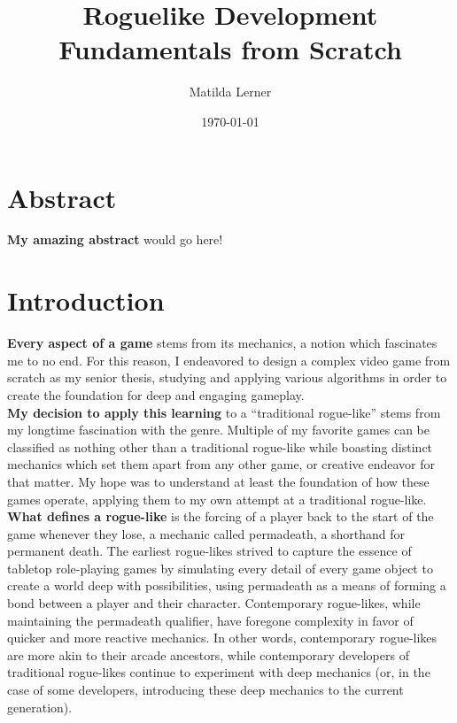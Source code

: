 \documentclass[sigconf,nonacm]{acmart}
\begin{document}
\title{Roguelike Development Fundamentals from Scratch}
\author{Matilda Lerner}
\date{\today}
\maketitle

\tableofcontents
\newpage
{}

\section{Abstract}
\textbf {My amazing abstract} would go here!

\section{Introduction}
\textbf {Every aspect of a game} stems from its mechanics, a notion which fascinates me to no end. For this reason, I endeavored to design a complex video game from scratch as my senior thesis, studying and applying various algorithms in order to create the foundation for deep and engaging gameplay.\\

\textbf {My decision to apply this learning} to a “traditional rogue-like” stems from my longtime fascination with the genre. Multiple of my favorite games can be classified as nothing other than a traditional rogue-like while boasting distinct mechanics which set them apart from any other game, or creative endeavor for that matter. My hope was to understand at least the foundation of how these games operate, applying them to my own attempt at a traditional rogue-like.\\

\textbf {What defines a rogue-like} is the forcing of a player back to the start of the game whenever they lose, a mechanic called permadeath, a shorthand for permanent death. The earliest rogue-likes strived to capture the essence of tabletop role-playing games by simulating every detail of every game object to create a world deep with possibilities, using permadeath as a means of forming a bond between a player and their character. Contemporary rogue-likes, while maintaining the permadeath qualifier, have foregone complexity in favor of quicker and more reactive mechanics. In other words, contemporary rogue-likes are more akin to their arcade ancestors, while contemporary developers of traditional rogue-likes continue to experiment with deep mechanics (or, in the case of some developers, introducing these deep mechanics to the current generation).\\
\end{document}

